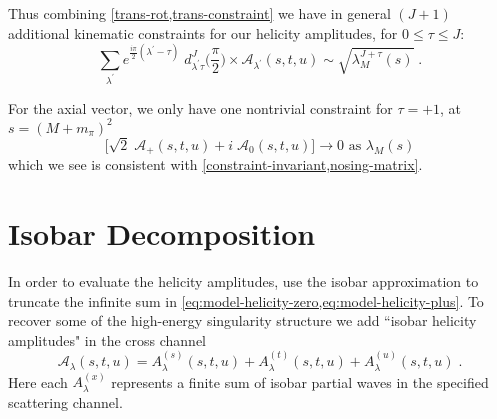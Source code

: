 \documentclass[10pt, aps,prd,amsmath,amssymb,superscriptaddress,onecolumn,
nofootinbib,showpacs,preprintnumbers]{revtex4-1}
\newcommand{\lamp}{{\lambda^\prime}}
\begin{document}
Thus combining \cref{trans-rot,trans-constraint} we have in general \((J + 1)\) additional kinematic constraints for our helicity amplitudes, for \(0 \leq \tau \leq J\):
  \begin{equation}
    \sum_{\lamp} e^{\frac{i\pi}{2} (\lamp - \tau)} \; d^J_{\lamp \tau}\bigg(\frac{\pi}{2} \bigg) \times \mathcal{A}_\lamp(s,t,u) \sim \sqrt{\lambda^{J + \tau}_M(s)}   \; .
  \end{equation}

For the axial vector, we only have one nontrivial constraint for \(\tau = +1\), at \(s = (M+m_\pi)^2\)
  \begin{equation}
      \bigg[ \sqrt{2} \; \mathcal{A}_+(s,t,u) + i \; \mathcal{A}_0(s,t,u) \bigg] \to 0 \text{ as } \lambda_M(s)
  \end{equation}
which we see is consistent with \cref{constraint-invariant,nosing-matrix}.
\section{Isobar Decomposition} \label{sec:isobar-decomp}
In order to evaluate the helicity amplitudes, use the isobar approximation to truncate the infinite sum in \cref{eq:model-helicity-zero,eq:model-helicity-plus}. To recover some of the high-energy singularity structure we add ``isobar helicity amplitudes" in the cross channel
  \begin{equation}
    \label{eq:isobar-def}
    \mathcal{A}_\lambda(s,t,u) = A_\lambda^{(s)}(s,t,u) +  A_\lambda^{(t)}(s,t,u) + A_\lambda^{(u)}(s,t,u) \; .
  \end{equation}
Here each \(A_\lambda^{(x)}\) represents a finite sum of isobar partial waves in the specified scattering channel.
\end{document}
